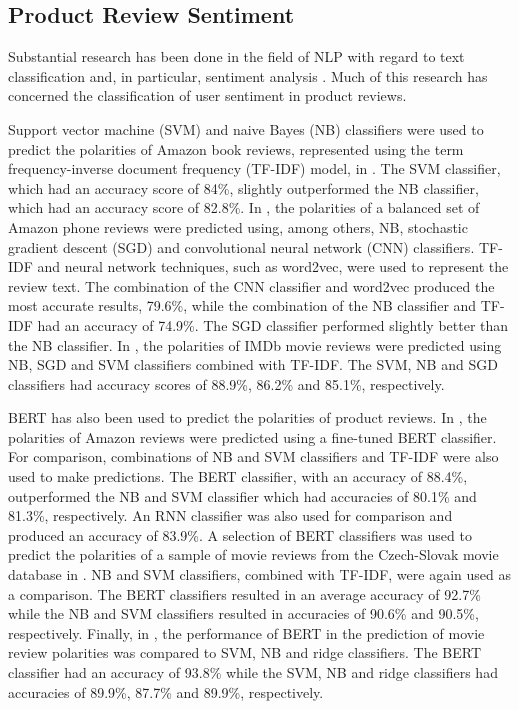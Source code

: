 \subsection{Product Review Sentiment} \label{sec:LR_NLP_Sent}

Substantial research has been done in the field of NLP with regard to text classification and, in particular, sentiment analysis \cite{mironczuk2018recent}. Much of this research has concerned the classification of user sentiment in product reviews.

Support vector machine (SVM) and naive Bayes (NB) classifiers were used to predict the polarities of Amazon book reviews, represented using the term frequency-inverse document frequency (TF-IDF) model, in \cite{dey2020comparative}. The SVM classifier, which had an accuracy score of 84\%, slightly outperformed the NB classifier, which had an accuracy score of 82.8\%. In \cite{aljuhani2019comparison}, the polarities of a balanced set of Amazon phone reviews were predicted using, among others, NB, stochastic gradient descent (SGD) and convolutional neural network (CNN) classifiers. TF-IDF and neural network techniques, such as word2vec, were used to represent the review text. The combination of the CNN classifier and word2vec produced the most accurate results, 79.6\%, while the combination of the NB classifier and TF-IDF had an accuracy of 74.9\%. The SGD classifier performed slightly better than the NB classifier. In \cite{tripathy2016classification}, the polarities of IMDb movie reviews were predicted using NB, SGD and SVM classifiers combined with TF-IDF. The SVM, NB and SGD classifiers had accuracy scores of 88.9\%, 86.2\% and 85.1\%, respectively.

BERT has also been used to predict the polarities of product reviews. In \cite{geetha2021improving}, the polarities of Amazon reviews were predicted using a fine-tuned BERT classifier. For comparison, combinations of NB and SVM classifiers and TF-IDF were also used to make predictions. The BERT classifier, with an accuracy of 88.4\%, outperformed the NB and SVM classifier which had accuracies of 80.1\% and 81.3\%, respectively. An RNN classifier was also used for comparison and produced an accuracy of 83.9\%. A selection of BERT classifiers was used to predict the polarities of a sample of movie reviews from the Czech-Slovak movie database in \cite{lehevcka2020bert}. NB and SVM classifiers, combined with TF-IDF, were again used as a comparison. The BERT classifiers resulted in an average accuracy of 92.7\% while the NB and SVM classifiers resulted in accuracies of 90.6\% and 90.5\%, respectively. Finally, in \cite{gonzalez2020comparing}, the performance of BERT in the prediction of movie review polarities was compared to SVM, NB and ridge classifiers. The BERT classifier had an accuracy of 93.8\% while the SVM, NB and ridge classifiers had accuracies of 89.9\%, 87.7\% and 89.9\%, respectively.


